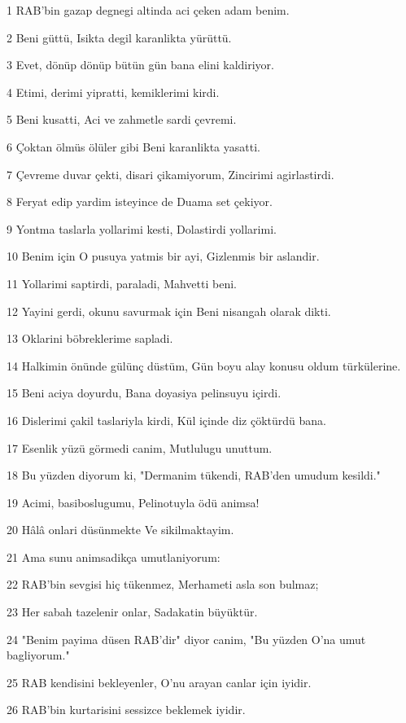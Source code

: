 \par 1 RAB'bin gazap degnegi altinda aci çeken adam benim.
\par 2 Beni güttü, Isikta degil karanlikta yürüttü.
\par 3 Evet, dönüp dönüp bütün gün bana elini kaldiriyor.
\par 4 Etimi, derimi yipratti, kemiklerimi kirdi.
\par 5 Beni kusatti, Aci ve zahmetle sardi çevremi.
\par 6 Çoktan ölmüs ölüler gibi Beni karanlikta yasatti.
\par 7 Çevreme duvar çekti, disari çikamiyorum, Zincirimi agirlastirdi.
\par 8 Feryat edip yardim isteyince de Duama set çekiyor.
\par 9 Yontma taslarla yollarimi kesti, Dolastirdi yollarimi.
\par 10 Benim için O pusuya yatmis bir ayi, Gizlenmis bir aslandir.
\par 11 Yollarimi saptirdi, paraladi, Mahvetti beni.
\par 12 Yayini gerdi, okunu savurmak için Beni nisangah olarak dikti.
\par 13 Oklarini böbreklerime sapladi.
\par 14 Halkimin önünde gülünç düstüm, Gün boyu alay konusu oldum türkülerine.
\par 15 Beni aciya doyurdu, Bana doyasiya pelinsuyu içirdi.
\par 16 Dislerimi çakil taslariyla kirdi, Kül içinde diz çöktürdü bana.
\par 17 Esenlik yüzü görmedi canim, Mutlulugu unuttum.
\par 18 Bu yüzden diyorum ki, "Dermanim tükendi, RAB'den umudum kesildi."
\par 19 Acimi, basiboslugumu, Pelinotuyla ödü animsa!
\par 20 Hâlâ onlari düsünmekte Ve sikilmaktayim.
\par 21 Ama sunu animsadikça umutlaniyorum:
\par 22 RAB'bin sevgisi hiç tükenmez, Merhameti asla son bulmaz;
\par 23 Her sabah tazelenir onlar, Sadakatin büyüktür.
\par 24 "Benim payima düsen RAB'dir" diyor canim, "Bu yüzden O'na umut bagliyorum."
\par 25 RAB kendisini bekleyenler, O'nu arayan canlar için iyidir.
\par 26 RAB'bin kurtarisini sessizce beklemek iyidir.

